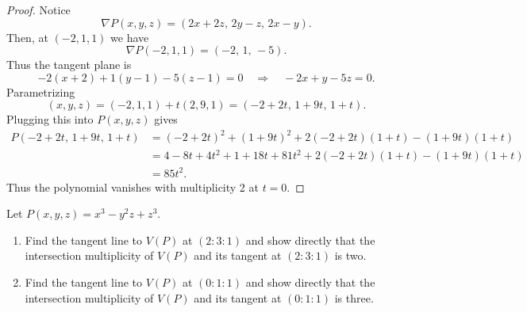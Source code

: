 \begin{proof}
    Notice
    \[
    \nabla P(x,y,z) = (2x + 2z,\, 2y - z,\, 2x - y).
    \]
    Then, at $(-2,1,1)$ we have
    \[
    \nabla P(-2,1,1) = (-2,\,1,\,-5).
    \]
    Thus the tangent plane is
    \[
    -2(x + 2) + 1(y - 1) - 5(z - 1) = 0 \quad \Longrightarrow \quad -2x + y - 5z = 0.
    \]
    Parametrizing
    \[
    (x,y,z) = (-2,1,1) + t(2,9,1) = (-2+2t,\, 1+9t,\, 1+t).
    \]
    Plugging this into $P(x,y,z)$ gives
    \[
    \begin{aligned}
    P(-2+2t,\,1+9t,\,1+t) &= (-2+2t)^2 + (1+9t)^2 + 2(-2+2t)(1+t) - (1+9t)(1+t) \\
    &= 4 - 8t + 4t^2 + 1 + 18t + 81t^2 + 2(-2+2t)(1+t) - (1+9t)(1+t) \\
    &= 85 t^2.
    \end{aligned}
    \]
    Thus the polynomial vanishes with multiplicity 2 at $t=0$.
\end{proof}

\begin{tcolorbox}[title=Problem 16, breakable]
    Let $P(x, y, z) = x^3 - y^2 z + z^3$.
    \begin{enumerate}
        \item Find the tangent line to $V(P)$ at $(2 : 3 : 1)$ and show directly that 
        the intersection multiplicity of $V(P)$ and its tangent at $(2 : 3 : 1)$ is two.
        \item Find the tangent line to $V(P)$ at $(0 : 1 : 1)$ and show directly that 
        the intersection multiplicity of $V(P)$ and its tangent at $(0 : 1 : 1)$ is three.
    \end{enumerate}
\end{tcolorbox}

